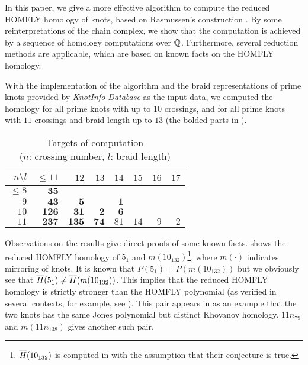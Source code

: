 In this paper, we give a more effective algorithm to compute the reduced HOMFLY homology of knots, based on Rasmussen's construction \cite{Ras15}. 
By some reinterpretations of the chain complex, we show that the computation is achieved by a sequence of homology computations over $\mathbb{Q}$. Furthermore, several reduction methods are applicable, which are based on known facts on the HOMFLY homology.

With the implementation of the algorithm \cite{kr-calc} and the braid representations of prime knots provided by \textit{KnotInfo Database} \cite{knotinfo} as the input data, we computed the homology for all prime knots with up to $10$ crossings, and for all prime knots with $11$ crossings and braid length up to $13$ (the bolded parts in ).

\begin{table}[t]
\centering
\begin{tabular}{r|rrrrrrr}
$n \setminus l$	& $\leq 11$	& $12$ & $13$ & $14$ & $15$ & $16$ & $17$\\
\hline
$\leq 8$ & $\mathbf{35}$ \\
$9$ & $\mathbf{43}$ & $\mathbf{5}$ & & $\textbf{1}$ \\
$10$ & $\mathbf{126}$ & $\mathbf{31}$ & $\textbf{2}$ & $\textbf{6}$ \\
$11$ & $\mathbf{237}$ & $\mathbf{135}$ & $\textbf{74}$ & $81$ & $14$ & $9$ & $2$\\
\end{tabular}
\caption{Targets of computation\\ ($n$: crossing number, $l$: braid length)}
\label{table:targets}
\vspace{1em}
\end{table}



Observations on the results give direct proofs of some known facts.  shows the reduced HOMFLY homology of $5_1$ and $m(10_{132})$\footnote{$\overline{H}(10_{132})$ is computed in \cite{DGR} with the assumption that their conjecture is true.}, where $m(\cdot)$ indicates mirroring of knots. It is known that $P(5_1) = P(m(10_{132}))$ but we obviously see that $\overline{H}(5_1) \neq \overline{H}(m(10_{132}))$. This implies that the reduced HOMFLY homology is strictly stronger than the HOMFLY polynomial (as verified in several contexts, for example, see \cite{Kawamuro}). This pair appears in \cite{BarNatan:2002} as an example that the two knots has the same Jones polynomial but distinct Khovanov homology. $11n_{79}$ and $m(11n_{138})$ gives another such pair. 

